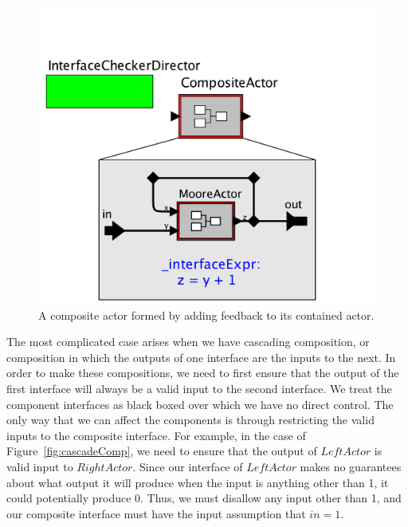 \documentclass[preprint,11pt]{sigplanconf}
\begin{document}
\begin{figure}[htbp]
\centering
\includegraphics[width=\columnwidth]{figs/feedbackComp}
\caption{A composite actor formed by adding feedback to its contained actor.}
\label{fig:feedbackComp}
\end{figure}

The most complicated case arises when we have cascading composition, or
composition in which the outputs of one interface are the inputs to the next.
In order to make these compositions, we need to first ensure that the output of
the first interface will always be a valid input to the second interface.  We
treat the component interfaces as black boxed over which we have no direct
control.  The only way that we can affect the components is through restricting
the valid inputs to the composite interface.
%
For example, in the case of Figure~\ref{fig:cascadeComp}, we need to ensure
that the output of $LeftActor$ is valid input to $RightActor$.  Since our
interface of $LeftActor$ makes no guarantees about what output it will produce
when the input is anything other than 1, it could potentially produce 0. Thus,
we must disallow any input other than 1, and our composite interface must have
the input assumption that $in = 1$.
\end{document}

